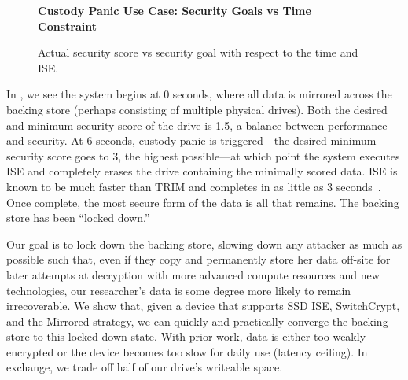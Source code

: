 \begin{figure}[ht] \textbf{Custody Panic Use Case: Security Goals vs Time
Constraint}\par\medskip
   \centering
   {} \caption{Actual security score vs
   security goal with respect to the time and ISE.}
  \label{fig:usecase-custody}
\end{figure}

In , we see the system begins at 0 seconds, where
all data is mirrored across the backing store (perhaps consisting of multiple
physical drives). Both the desired and minimum security score of the drive is
1.5, a balance between performance and security. At 6 seconds, custody panic is
triggered---the desired minimum security score goes to 3, the highest
possible---at which point the system executes ISE and completely erases the
drive containing the minimally scored data. ISE is known to be much faster than
TRIM and completes in as little as 3
seconds~\cite{SeaGate,Samsung,ThatOtherOEM}. Once complete, the most secure form
of the data is all that remains. The backing store has been ``locked down.''

Our goal is to lock down the backing store, slowing down any attacker as
much as possible such that, even if they copy and permanently store her data
off-site for later attempts at decryption with more advanced compute resources
and new technologies, our researcher's data is some degree more likely to remain
irrecoverable. We show that, given a device that supports SSD ISE, SwitchCrypt,
and the Mirrored strategy, we can quickly and practically converge the backing
store to this locked down state. With prior work, data is either too weakly
encrypted or the device becomes too slow for daily use (latency ceiling). In
exchange, we trade off half of our drive's writeable space.

